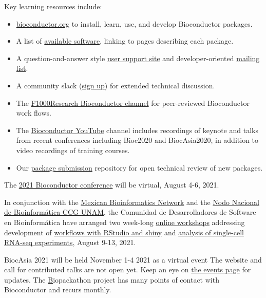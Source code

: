 Key learning resources include:
\begin{itemize}
\item \href{https://bioconductor.org}{bioconductor.org} to install,
  learn, use, and develop Bioconductor packages.
\item A list of \href{https://bioconductor.org/packages}{available
  software}, linking to pages describing each package.
\item A question-and-answer style
  \href{https://support.bioconductor.org}{user support site} and
  developer-oriented
  \href{https://stat.ethz.ch/mailman/listinfo/bioc-devel}{mailing
    list}.
\item A community slack (\href{https://bioc-community.herokuapp.com/}{sign up})
   for extended technical discussion.
\item The
  \href{https://f1000research.com/channels/bioconductor}{F1000Research
    Bioconductor channel} for peer-reviewed Bioconductor work flows.
\item The \href{https://www.youtube.com/user/bioconductor}{Bioconductor YouTube} 
     channel includes recordings of keynote and talks from recent 
     conferences including Bioc2020 and BiocAsia2020, in addition to 
     video recordings of training courses. 
\item Our \href{https://github.com/Bioconductor/Contributions}{package
  submission} repository for open technical review of new packages.
\end{itemize}

The \href{https://bioc2021.bioconductor.org/}{2021 Bioconductor conference} will be virtual,
August 4-6, 2021.

In conjunction with the \href{https://twitter.com/RBioinformatica}{Mexican Bioinformatics Network} and 
the \href{https://twitter.com/nnb_unam}{Nodo Nacional de Bioinformática CCG UNAM},
the Comunidad de Desarrolladores de Software en Bioinformática
have arranged two week-long
\href{https://comunidadbioinfo.github.io/post/cdsb-2021-workshops/#.YOgqyhNuelY}{online workshops}
addressing development of 
\href{https://comunidadbioinfo.github.io/cdsb2021_workflows/}{workflows with RStudio and shiny} and
\href{https://comunidadbioinfo.github.io/cdsb2021_scRNAseq/}{analysis of single-cell RNA-seq experiments},
August 9-13, 2021.

BiocAsia 2021 will be held November 1-4 2021 as a virtual event
The website and call for contributed talks are not open yet.
Keep an eye on \href{https://bioconductor.org/help/events/}{the events page}
for updates.  The \href{https://sites.google.com/view/biopackathon} Biopackathon
project has many points of contact with Bioconductor and recurs monthly.

